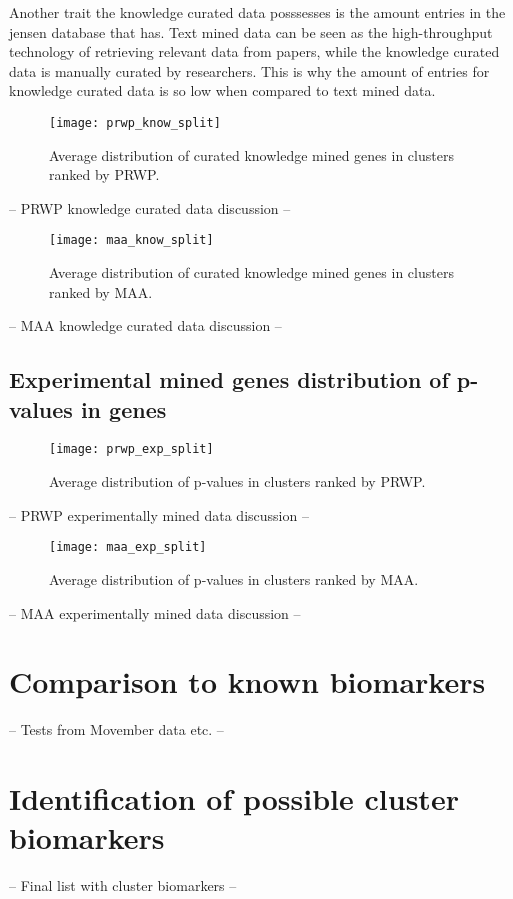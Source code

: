 Another trait the knowledge curated data posssesses is the amount entries in the
\gls{jensen} database that has. Text mined data can be seen as the
high-throughput technology of retrieving relevant data from papers, while the
knowledge curated data is manually curated by researchers. This is why the
amount of entries for knowledge curated data is so low when compared to text
mined data.

\begin{figure}[H]
    \label{fig:know-iref-prwp}
    \texttt{[image: prwp\_know\_split]}
    \caption{Average distribution of curated knowledge mined genes in clusters
    ranked by PRWP.}
\end{figure}
-- PRWP knowledge curated data discussion --

\begin{figure}[H]
    \label{fig:know-iref-maa}
    \texttt{[image: maa\_know\_split]}
    \caption{Average distribution of curated knowledge mined genes in clusters
    ranked by MAA.}
\end{figure}
-- MAA knowledge curated data discussion --

\subsection{Experimental mined genes distribution of p-values in genes}
\begin{figure}[H]
    \label{fig:exp-iref-prwp}
    \texttt{[image: prwp\_exp\_split]}
    \caption{Average distribution of p-values in clusters ranked by PRWP.}
\end{figure}
-- PRWP experimentally mined data discussion --

\begin{figure}[H]
    \label{fig:exp-iref-maa}
    \texttt{[image: maa\_exp\_split]}
    \caption{Average distribution of p-values in clusters ranked by MAA.}
\end{figure}
-- MAA experimentally mined data discussion --


\section{Comparison to known biomarkers}
-- Tests from Movember data etc. --

\section{Identification of possible cluster biomarkers}
-- Final list with cluster biomarkers --
